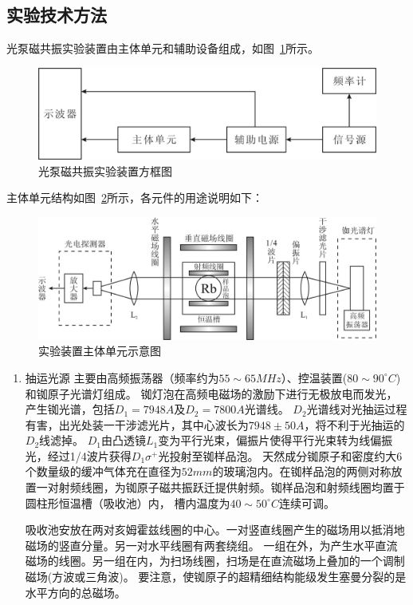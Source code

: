 \documentclass[11pt,a4paper]{article}
\begin{document}
\begin{spacing}{1.3}
\begin{CJK*}{UTF8}{gbsn}
\section{实验技术方法}
光泵磁共振实验装置由主体单元和辅助设备组成，如图~\ref{fig2-6-3}所示。
\begin{figure}[H]
\centering
\includegraphics[width=.6\textwidth]{fig2-6-3}
\caption{光泵磁共振实验装置方框图}
\label{fig2-6-3}
\end{figure} 
\par 
主体单元结构如图~\ref{fig2-6-4}所示，各元件的用途说明如下：
\begin{figure}[!htbp]
\centering
\includegraphics[width=.8\textwidth]{fig2-6-4}
\caption{实验装置主体单元示意图}
\label{fig2-6-4}
\end{figure} 
\begin{enumerate}
\item 抽运光源  主要由高频振荡器（频率约为$55\sim65 MHz$）、控温装置($80\sim90^{\circ}C$)和铷原子光谱灯组成。
铷灯泡在高频电磁场的激励下进行无极放电而发光，产生铷光谱，包括$D_1=7948A$及$D_2=7800A$光谱线。
$D_2$光谱线对光抽运过程有害，出光处装一干涉滤光片，其中心波长为$7948\pm50A$，将不利于光抽运的$D_2$线滤掉。
$D_1$由凸透镜$L_1$变为平行光束，偏振片使得平行光束转为线偏振光，经过1/4波片获得$D_1\sigma ^+$光投射至铷样品泡。
  天然成分铷原子和密度约大6个数量级的缓冲气体充在直径为$52mm$的玻璃泡内。在铷样品泡的两侧对称放
置一对射频线圈，为铷原子磁共振跃迁提供射频。铷样品泡和射频线圈均置于圆柱形恒温槽（吸收池）内，
槽内温度为$40\sim 50^{\circ}C$连续可调。\par
吸收池安放在两对亥姆霍兹线圈的中心。一对竖直线圈产生的磁场用以抵消地磁场的竖直分量。另一对水平线圈有两套绕组。
一组在外，为产生水平直流磁场的线圈。另一组在内，为扫场线圈，扫场是在直流磁场上叠加的一个调制磁场(方波或三角波)。
要注意，使铷原子的超精细结构能级发生塞曼分裂的是水平方向的总磁场。\par

\end{enumerate}
\end{CJK*}
\end{spacing}
\end{document}
